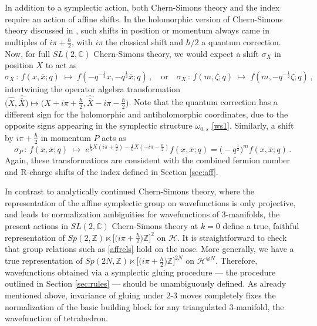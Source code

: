 \documentclass[11pt,letterpaper]{article}
\numberwithin{equation}{section}
\newcommand{\be}{\begin{equation}}
\newcommand{\ee}{\end{equation}}
\newcommand{\ol}{\overline}
\newcommand{\Z}{{\mathbb Z}}
\newcommand{\C}{{\mathbb C}}
\newcommand{\CH}{\mathcal{H}}
\begin{document}
In addition to a symplectic action, both Chern-Simons theory and the index require an action of affine shifts. In the holomorphic version of Chern-Simons theory discussed in \cite{Dimofte-QRS}, such shifts in position or momentum always came in multiples of $i\pi+\tfrac\hbar2$, with $i\pi$ the classical shift and $\hbar/2$ a quantum correction. Now, for full $SL(2,\C)$ Chern-Simons theory, we would expect a shift $\sigma_X$ in position $X$ to act as
%
\be \sigma_X\,:\,f(x,\ol x;q)\;\mapsto\; f(-q^{-\frac12}x,-q^{\frac12}\ol x;q)\,,\quad\text{or}\quad  \sigma_X\,:\,f(m,\zeta;q)\;\mapsto\; f(m,-q^{-\frac12}\zeta;q)\,,\ee
%
intertwining the operator algebra transformation $\big(\hat X,\hat{\ol X}\big)\mapsto \big(\hat X+i\pi+\tfrac\hbar2,\hat {\ol X}-i\pi-\tfrac\hbar2\big)$. Note that the quantum correction has a different sign for the holomorphic and antiholomorphic coordinates, due to the opposite signs appearing in the symplectic structure $\omega_{0,s}$ \eqref{ws1}. Similarly, a shift by $i\pi +\tfrac\hbar2$ in momentum $P$ acts as
%
\be \sigma_P\,:\,f(x,\ol x;q)\;\mapsto\; e^{\frac1\hbar X(i\pi+\frac\hbar 2)-\frac1\hbar X(-i\pi-\frac\hbar 2)}f(x,\ol x;q) = \big(-q^{\frac12}\big)^mf(x,\ol x;q)\,.\ee
%
Again, these transformations are consistent with the combined fermion number and R-charge shifts of the index defined in Section \ref{sec:aff}.

In contrast to analytically continued Chern-Simons theory, where the representation of the affine symplectic group on wavefunctions is only projective, and leads to normalization ambiguities for wavefunctions of 3-manifolds, the present actions in $SL(2,\C)$ Chern-Simons theory at $k=0$ define a true, faithful representation of $Sp(2,\Z)\ltimes \big[\big(i\pi+\tfrac\hbar2\big)\Z\big]^2$ on $\CH$. It is straightforward to check that group relations such as \eqref{affrels} hold on the nose. More generally, we have a true representation of $Sp(2N,\Z)\ltimes \big[\big(i\pi+\tfrac\hbar2\big)\Z\big]^{2N}$ on $\CH^{\otimes N}$. Therefore, wavefunctions obtained via a symplectic gluing procedure --- the procedure outlined in Section \ref{sec:rules} --- should be unambiguously defined. As already mentioned above, invariance of gluing under 2-3 moves completely fixes the normalization of the basic building block for any triangulated 3-manifold, the wavefunction of tetrahedron.
\end{document}
